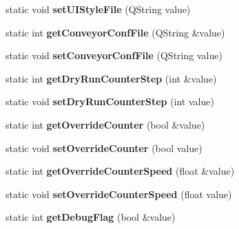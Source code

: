 \begin{DoxyCompactItemize}
\item 
\hypertarget{classAppConf_adc84605f34c216f4faab9cad377720d8}{static void {\bfseries set\-U\-I\-Style\-File} (Q\-String value)}\label{classAppConf_adc84605f34c216f4faab9cad377720d8}

\item 
\hypertarget{classAppConf_a7552903bf15df3a74a9e1516385c552d}{static int {\bfseries get\-Conveyor\-Conf\-File} (Q\-String \&value)}\label{classAppConf_a7552903bf15df3a74a9e1516385c552d}

\item 
\hypertarget{classAppConf_a8de90fa265a76c913c0467df51a288b9}{static void {\bfseries set\-Conveyor\-Conf\-File} (Q\-String value)}\label{classAppConf_a8de90fa265a76c913c0467df51a288b9}

\item 
\hypertarget{classAppConf_a4e28bdb4bbb9d5a73c94edcea5859589}{static int {\bfseries get\-Dry\-Run\-Counter\-Step} (int \&value)}\label{classAppConf_a4e28bdb4bbb9d5a73c94edcea5859589}

\item 
\hypertarget{classAppConf_af76c6179a724418c24bf45e9c89b2e29}{static void {\bfseries set\-Dry\-Run\-Counter\-Step} (int value)}\label{classAppConf_af76c6179a724418c24bf45e9c89b2e29}

\item 
\hypertarget{classAppConf_aa3da0207d94d0b78f0e9a5b0fa6e2257}{static int {\bfseries get\-Override\-Counter} (bool \&value)}\label{classAppConf_aa3da0207d94d0b78f0e9a5b0fa6e2257}

\item 
\hypertarget{classAppConf_ad7fc9df2980e91c8ad140045d5071689}{static void {\bfseries set\-Override\-Counter} (bool value)}\label{classAppConf_ad7fc9df2980e91c8ad140045d5071689}

\item 
\hypertarget{classAppConf_afc881cd184cfffc90893cf264032e003}{static int {\bfseries get\-Override\-Counter\-Speed} (float \&value)}\label{classAppConf_afc881cd184cfffc90893cf264032e003}

\item 
\hypertarget{classAppConf_ab1bcd589b8fdeddcd8e0b5877ca201ae}{static void {\bfseries set\-Override\-Counter\-Speed} (float value)}\label{classAppConf_ab1bcd589b8fdeddcd8e0b5877ca201ae}

\item 
\hypertarget{classAppConf_ac7d2e6f015f7f2f9c8aeefbf920c0eeb}{static int {\bfseries get\-Debug\-Flag} (bool \&value)}\label{classAppConf_ac7d2e6f015f7f2f9c8aeefbf920c0eeb}


\end{DoxyCompactItemize}
